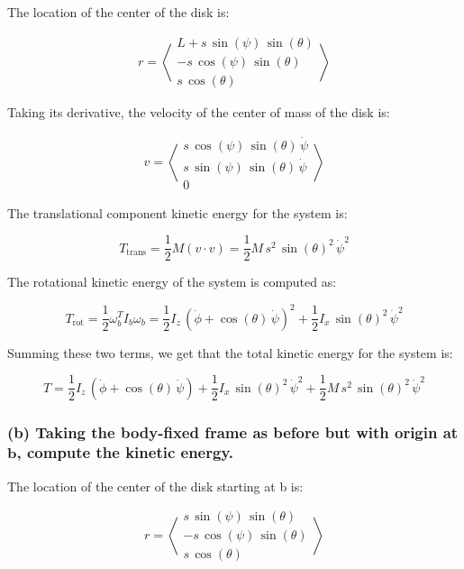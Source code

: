 \documentclass[12pt, letterpaper]{../assignment}
\begin{document}
The location of the center of the disk is:

$$ r = \left<\begin{array}{c}
L+s\,\sin \left(\psi \right)\,\sin \left(\theta \right)\\
-s\,\cos \left(\psi \right)\,\sin \left(\theta \right)\\
s\,\cos \left(\theta \right)
\end{array}\right> $$

Taking its derivative, the velocity of the center of mass of the disk is:

$$ v = \left<\begin{array}{c}
s\,\cos \left(\psi \right)\,\sin \left(\theta \right)\,\dot{\psi} \\
s\,\sin \left(\psi \right)\,\sin \left(\theta \right)\,\dot{\psi} \\
0
\end{array}\right> $$

The translational component kinetic energy for the system is:

$$ T_\text{trans} = \frac{1}{2} M \left( v \cdot v \right) =
\frac{1}{2}M\,s^2 \,{\sin \left(\theta \right)}^2 \,{\dot{\psi}}^2$$

The rotational kinetic energy of the system is computed as:

$$ T_\text{rot} = \frac{1}{2} \omega_b^T I_b  \omega_b =
\frac{1}{2}I_z \,{\left(\dot{\phi} +\cos \left(\theta \right)\,\dot{\psi} \right)^2}+\frac{1}{2}I_x \,{\sin \left(\theta \right)^2}\,{\dot{\psi}}^2$$

Summing these two terms, we get that the total kinetic energy for the system is:

\begin{answer}
$$ T = \frac{1}{2}I_{z}\,\left(\dot{\phi} +\cos\left(\theta \right)\,\dot{\psi} \right)+\frac{1}{2}I_{x}\,\sin \left(\theta \right)^2\,\dot{\psi}^2+\frac{1}{2}M\,s^2\,\sin \left(\theta \right)^2\,\dot{\psi}^2 $$
\end{answer}

\subsubsection*{(b) Taking the body-fixed frame as before but with origin at $\bm{b}$,
compute the kinetic energy.}

The location of the center of the disk starting at b is:

$$ r = \left<\begin{array}{c}
s\,\sin \left(\psi \right)\,\sin \left(\theta \right)\\
-s\,\cos \left(\psi \right)\,\sin \left(\theta \right)\\
s\,\cos \left(\theta \right)
\end{array}\right> $$
\end{document}
